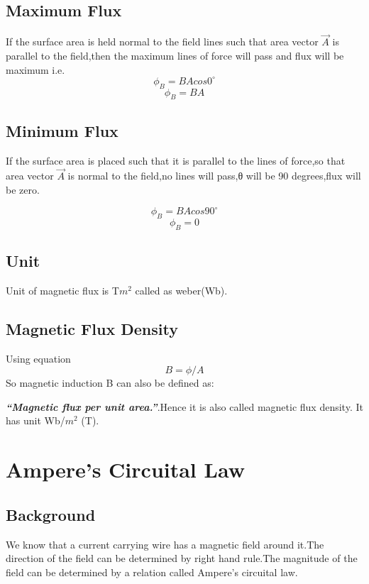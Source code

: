 \subsection{Maximum Flux}
If the surface area is held normal to the field lines such that area vector $\vec{A}$ is parallel to the field,then the maximum lines of force will pass and flux will be maximum i.e.
\begin{equation}
\phi_{B} =  BA cos0^{\circ} \nonumber
\end{equation}
\begin{equation}
\phi_{B} = BA \nonumber  
\end{equation}

\subsection{Minimum Flux}
 If the surface area is placed such that it is parallel to the lines of force,so that area vector $\vec{A}$  is normal to the field,no lines will pass,θ will be 90 degrees,flux will be zero.
 
\begin{equation}
\phi_{B} =  BA cos90^{\circ} \nonumber
\end{equation}
\begin{equation}
\phi_{B} = 0 \nonumber  
\end{equation}

\subsection{Unit}
Unit of magnetic flux is T$m^{2}$ called as weber(Wb).

\subsection{Magnetic Flux Density}
Using equation
\begin{equation}
B= \phi /A \nonumber  
\end{equation}
So magnetic induction B can also be defined as:

\textit{\textbf{“Magnetic flux per unit area.”}}.Hence it is also called magnetic flux density. It has unit Wb/$m^{2}$ (T).

\section{Ampere’s Circuital Law}
\subsection{Background}
 We know that a current carrying wire has a magnetic field around it.The direction of the field can be determined by right hand rule.The magnitude of the field can be determined by a relation called Ampere’s circuital law.
